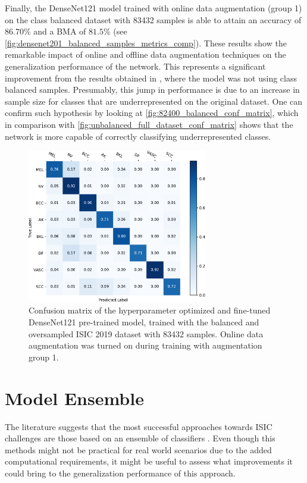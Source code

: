     Finally, the DenseNet121 model trained with online data augmentation (group 1) on the class balanced dataset with 83432 samples is able to attain an accuracy of $86.70\%$ and a \ac{BMA} of $81.5\%$ (see \autoref{fig:densenet201_balanced_samples_metrics_comp}). These results show the remarkable impact of online and offline data augmentation techniques on the generalization performance of the network. This represents a significant improvement from the results obtained in , where the model was not using class balanced samples. Presumably, this jump in performance is due to an increase in sample size for classes that are underrepresented on the original dataset. One can confirm such hypothesis by looking at \autoref{fig:82400_balanced_conf_matrix}, which in comparison with \autoref{fig:unbalanced_full_dataset_conf_matrix} shows that the network is more capable of correctly classifying underrepresented classes. \par
    \begin{figure}[ht]
        \centering
        \includegraphics[width=0.7\textwidth]{figs/densenet201_82400_balanced_conf_matrix.pdf}
        \caption{Confusion matrix of the hyperparameter optimized and fine-tuned DenseNet121 pre-trained model, trained with the balanced and oversampled \ac{ISIC} 2019 dataset with 83432 samples. Online data augmentation was turned on during training with augmentation group 1.}
        \label{fig:82400_balanced_conf_matrix}
    \end{figure}
    
\section{Model Ensemble} 
\label{section:ensemble}
    The literature suggests that the most successful approaches towards \ac{ISIC} challenges are those based on an ensemble of classifiers \cite{humanvsisic2018}. Even though this methods might not be practical for real world scenarios due to the added computational requirements, it might be useful to assess what improvements it could bring to the generalization performance of this approach. \par
    
